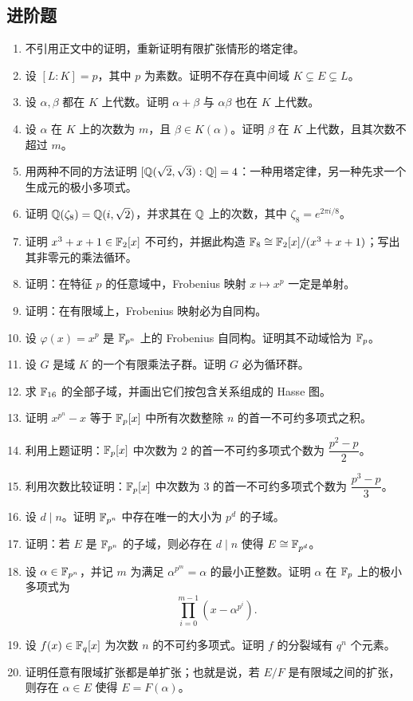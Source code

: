 \subsection*{进阶题}

\begin{enumerate}[label=\arabic*., leftmargin=2.5em, resume]
\item \textbf{\medium} 不引用正文中的证明，重新证明有限扩张情形的塔定律。
\item \textbf{\medium} 设 $[L:K]=p$，其中 $p$ 为素数。证明不存在真中间域 $K\subsetneq E\subsetneq L$。
\item \textbf{\medium} 设 $\alpha,\beta$ 都在 $K$ 上代数。证明 $\alpha+\beta$ 与 $\alpha\beta$ 也在 $K$ 上代数。
\item \textbf{\medium} 设 $\alpha$ 在 $K$ 上的次数为 $m$，且 $\beta\in K(\alpha)$。证明 $\beta$ 在 $K$ 上代数，且其次数不超过 $m$。
\item \textbf{\medium} 用两种不同的方法证明 $[\mathbb{Q}(\sqrt2,\sqrt3):\mathbb{Q}]=4$：一种用塔定律，另一种先求一个生成元的极小多项式。
\item \textbf{\medium} 证明 $\mathbb{Q}(\zeta_8)=\mathbb{Q}(i,\sqrt2)$，并求其在 $\mathbb{Q}$ 上的次数，其中 $\zeta_8=e^{2\pi i/8}$。
\item \textbf{\medium} 证明 $x^3+x+1\in\mathbb{F}_2[x]$ 不可约，并据此构造 $\mathbb{F}_8\cong \mathbb{F}_2[x]/(x^3+x+1)$；写出其非零元的乘法循环。
\item \textbf{\medium} 证明：在特征 $p$ 的任意域中，Frobenius 映射 $x\mapsto x^p$ 一定是单射。
\item \textbf{\medium} 证明：在有限域上，Frobenius 映射必为自同构。
\item \textbf{\medium} 设 $\varphi(x)=x^p$ 是 $\mathbb{F}_{p^n}$ 上的 Frobenius 自同构。证明其不动域恰为 $\mathbb{F}_p$。
\item \textbf{\medium} 设 $G$ 是域 $K$ 的一个有限乘法子群。证明 $G$ 必为循环群。
\item \textbf{\medium} 求 $\mathbb{F}_{16}$ 的全部子域，并画出它们按包含关系组成的 Hasse 图。
\item \textbf{\medium} 证明 $x^{p^n}-x$ 等于 $\mathbb{F}_p[x]$ 中所有次数整除 $n$ 的首一不可约多项式之积。
\item \textbf{\medium} 利用上题证明：$\mathbb{F}_p[x]$ 中次数为 $2$ 的首一不可约多项式个数为 $\dfrac{p^2-p}{2}$。
\item \textbf{\medium} 利用次数比较证明：$\mathbb{F}_p[x]$ 中次数为 $3$ 的首一不可约多项式个数为 $\dfrac{p^3-p}{3}$。
\item \textbf{\medium} 设 $d\mid n$。证明 $\mathbb{F}_{p^n}$ 中存在唯一的大小为 $p^d$ 的子域。
\item \textbf{\medium} 证明：若 $E$ 是 $\mathbb{F}_{p^n}$ 的子域，则必存在 $d\mid n$ 使得 $E\cong \mathbb{F}_{p^d}$。
\item \textbf{\medium} 设 $\alpha\in\mathbb{F}_{p^n}$，并记 $m$ 为满足 $\alpha^{p^m}=\alpha$ 的最小正整数。证明 $\alpha$ 在 $\mathbb{F}_p$ 上的极小多项式为
\[
\prod_{i=0}^{m-1}(x-\alpha^{p^i}).
\]
\item \textbf{\medium} 设 $f(x)\in\mathbb{F}_q[x]$ 为次数 $n$ 的不可约多项式。证明 $f$ 的分裂域有 $q^n$ 个元素。
\item \textbf{\medium} 证明任意有限域扩张都是单扩张；也就是说，若 $E/F$ 是有限域之间的扩张，则存在 $\alpha\in E$ 使得 $E=F(\alpha)$。
\end{enumerate}

